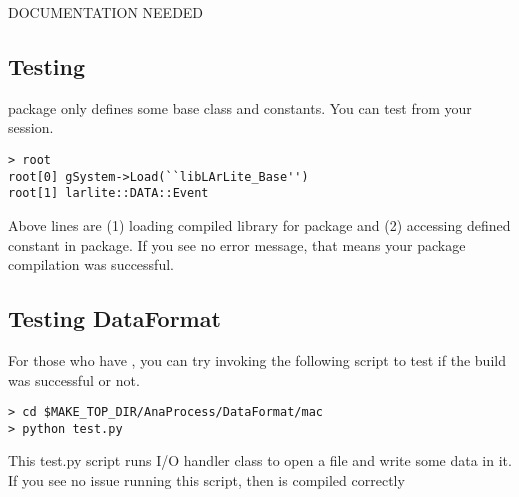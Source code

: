DOCUMENTATION NEEDED

\subsection{Testing \Base}

\Base package only defines some base class and constants. 
You can test from your \CINT session.
\begin{lstlisting}
> root
root[0] gSystem->Load(``libLArLite_Base'')
root[1] larlite::DATA::Event
\end{lstlisting}
Above lines are (1) loading compiled library for \Base package and (2) accessing defined constant in \Base package.
If you see no error message, that means your \Base package compilation was successful.

\subsection{Testing DataFormat}
For those who have \PyROOT, you can try invoking the following script to test if the build was successful or not.

\begin{lstlisting}
> cd $MAKE_TOP_DIR/AnaProcess/DataFormat/mac
> python test.py
\end{lstlisting}

This {\ttfamily test.py} script runs I/O handler class to open a \ROOT file and write some data in it.
If you see no issue running this script, then \DataFormat is compiled correctly
